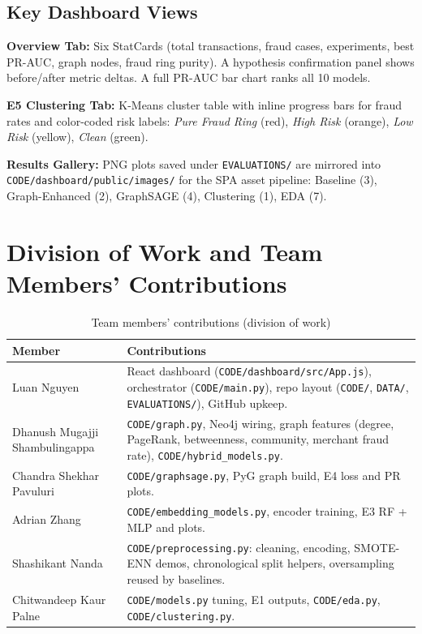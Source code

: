 \documentclass[conference]{IEEEtran}
\begin{document}
\subsection{Key Dashboard Views}

\textbf{Overview Tab:} Six StatCards (total transactions, fraud cases, experiments, best PR-AUC, graph nodes, fraud ring purity). A hypothesis confirmation panel shows before/after metric deltas. A full PR-AUC bar chart ranks all 10 models.

\textbf{E5 Clustering Tab:} K-Means cluster table with inline progress bars for fraud rates and color-coded risk labels: \textit{Pure Fraud Ring} (red), \textit{High Risk} (orange), \textit{Low Risk} (yellow), \textit{Clean} (green).

\textbf{Results Gallery:} PNG plots saved under \texttt{EVALUATIONS/} are mirrored into \texttt{CODE/dashboard/public/images/} for the SPA asset pipeline: Baseline (3), Graph-Enhanced (2), GraphSAGE (4), Clustering (1), EDA (7).

\section{Division of Work and Team Members' Contributions}

\begin{table}[htbp]
\centering
\caption{Team members' contributions (division of work)}
\label{tab:contributions}
\footnotesize
\begin{tabular}{@{}p{}p{}@{}}
\toprule
\textbf{Member} & \textbf{Contributions} \\
\midrule
Luan Nguyen &
React dashboard (\texttt{CODE/dashboard/src/App.js}), orchestrator (\texttt{CODE/main.py}), repo layout (\texttt{CODE/}, \texttt{DATA/}, \texttt{EVALUATIONS/}), GitHub upkeep. \\
\addlinespace
Dhanush Mugajji Shambulingappa &
\texttt{CODE/graph.py}, Neo4j wiring, graph features (degree, PageRank, betweenness, community, merchant fraud rate), \texttt{CODE/hybrid\_models.py}. \\
\addlinespace
Chandra Shekhar Pavuluri &
\texttt{CODE/graphsage.py}, PyG graph build, E4 loss and PR plots. \\
\addlinespace
Adrian Zhang &
\texttt{CODE/embedding\_models.py}, encoder training, E3 RF + MLP and plots. \\
\addlinespace
Shashikant Nanda &
\texttt{CODE/preprocessing.py}: cleaning, encoding, SMOTE-ENN demos, chronological split helpers, oversampling reused by baselines. \\
\addlinespace
Chitwandeep Kaur Palne &
\texttt{CODE/models.py} tuning, E1 outputs, \texttt{CODE/eda.py}, \texttt{CODE/clustering.py}. \\
\bottomrule
\end{tabular}
\end{table}
\end{document}
